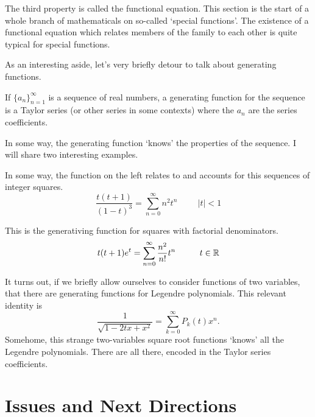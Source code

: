 \documentclass[fleqn,letterpaper]{report}
\begin{document}
The third property is called the functional equation. This
section is the start of a whole branch of mathematicals on
so-called `special functions'. The existence of a functional
equation which relates members of the family to each other is
quite typical for special functions. 

As an interesting aside, let's very briefly detour to talk
about generating functions.

\begin{defn}
If $\{a_n\}_{n=1}^\infty$ is a sequence of real numbers, a
generating function for the sequence is a Taylor series (or
other series in some contexts) where the $a_n$ are the series
coefficients. 
\end{defn}

In some way, the generating function `knows' the properties of
the sequence. I will share two interesting examples. 

\begin{example}
In some way, the function on the left relates to and accounts
for this sequences of integer squares. 
\begin{equation*}
\frac{t(t+1)}{(1-t)^3} = \sum_{n=0}^\infty n^2 t^n
\hspace{1cm} |t| < 1 
\end{equation*}
\end{example}

\begin{example}
This is the generativing function for squares with factorial
denominators.
\begin{equation*}
t(t+1)e^t = \sum_{n=0}^\infty \frac{n^2}{n!} t^n \hspace{1cm}
t \in \mathbb{R}
\end{equation*}
\end{example}

It turns out, if we briefly allow ourselves to consider
functions of two variables, that there are generating functions for
Legendre polynomials. This relevant identity is
\begin{equation*}
\frac{1}{\sqrt{1- 2tx+x^2}} = \sum_{k=0}^\infty P_k(t) x^n.
\end{equation*}
Somehome, this strange two-variables square root functions
`knows' all the Legendre polynomials. There are all there,
encoded in the Taylor series coefficients.

\section{Issues and Next Directions}
\label{issues}
\end{document}
